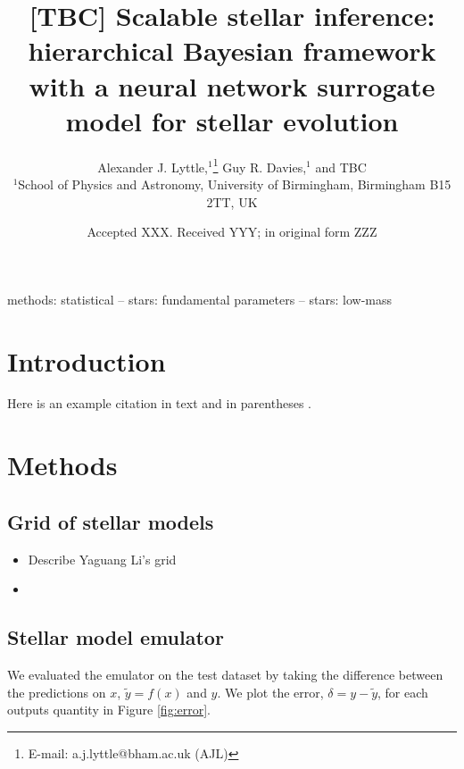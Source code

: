 \documentclass[fleqn,usenatbib]{mnras}
\title[Scalable stellar inference]{[TBC] Scalable stellar inference: hierarchical Bayesian framework with a neural network surrogate model for stellar evolution}
\author[A. J. Lyttle et al.]{
Alexander J. Lyttle,$^{1}$\thanks{E-mail: a.j.lyttle@bham.ac.uk (AJL)}
Guy R. Davies,$^{1}$
and TBC
\\
$^{1}$School of Physics and Astronomy, University of Birmingham, Birmingham B15 2TT, UK
}
\date{Accepted XXX. Received YYY; in original form ZZZ}
\begin{document}
\label{firstpage}
\pagerange{\pageref{firstpage}--\pageref{lastpage}}
\maketitle

\begin{abstract}

\end{abstract}

\begin{keywords}
methods: statistical -- stars: fundamental parameters -- stars: low-mass
\end{keywords}



\section{Introduction}

Here is an example citation in text \citet{Lyttle.Davies.ea2021} and in parentheses \citep{Lyttle.Davies.ea2021}.

\section{Methods}
\label{sec:methods}

\subsection{Grid of stellar models}
\label{sec:grid}

\begin{itemize}
    \item Describe Yaguang Li's grid
    \item 
\end{itemize}

\subsection{Stellar model emulator}
\label{sec:emulator}

We evaluated the emulator on the test dataset by taking the difference between the predictions on \(x\), \(\tilde{y} = f(x)\) and \(y\). We plot the error, \(\delta = y - \tilde{y}\), for each outputs quantity in Figure \ref{fig:error}.
\end{document}
